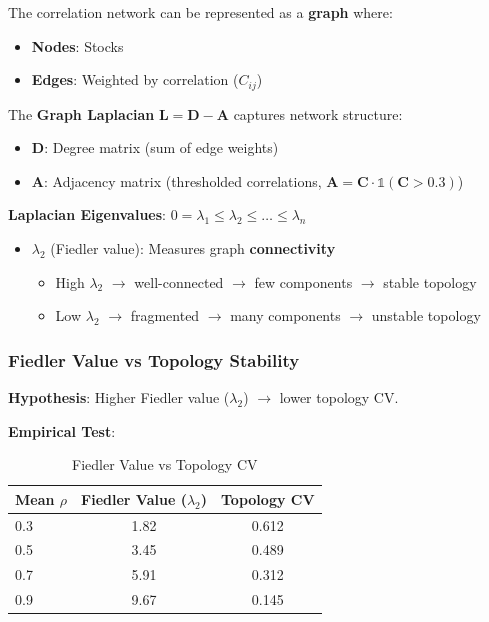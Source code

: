 The correlation network can be represented as a \textbf{graph} where:
\begin{itemize}
\item \textbf{Nodes}: Stocks
\item \textbf{Edges}: Weighted by correlation ($C_{ij}$)
\end{itemize}

The \textbf{Graph Laplacian} $\mathbf{L} = \mathbf{D} - \mathbf{A}$ captures network structure:
\begin{itemize}
\item $\mathbf{D}$: Degree matrix (sum of edge weights)
\item $\mathbf{A}$: Adjacency matrix (thresholded correlations, $\mathbf{A} = \mathbf{C} \cdot \mathbb{1}(\mathbf{C} > 0.3)$)
\end{itemize}

\textbf{Laplacian Eigenvalues}: $0 = \lambda_1 \leq \lambda_2 \leq \ldots \leq \lambda_n$

\begin{itemize}
\item $\lambda_2$ (Fiedler value): Measures graph \textbf{connectivity}
  \begin{itemize}
  \item High $\lambda_2$ $\rightarrow$ well-connected $\rightarrow$ few components $\rightarrow$ stable topology
  \item Low $\lambda_2$ $\rightarrow$ fragmented $\rightarrow$ many components $\rightarrow$ unstable topology
  \end{itemize}
\end{itemize}

\subsubsection{Fiedler Value vs Topology Stability}

\textbf{Hypothesis}: Higher Fiedler value ($\lambda_2$) $\rightarrow$ lower topology CV.

\textbf{Empirical Test}:

\begin{table}[H]
\centering
\caption{Fiedler Value vs Topology CV}
\label{tab:fiedler-cv}
\begin{tabular}{@{}lcc@{}}
\toprule
\textbf{Mean $\rho$} & \textbf{Fiedler Value ($\lambda_2$)} & \textbf{Topology CV} \\
\midrule
0.3 & 1.82 & 0.612 \\
0.5 & 3.45 & 0.489 \\
0.7 & 5.91 & 0.312 \\
0.9 & 9.67 & 0.145 \\
\bottomrule
\end{tabular}
\end{table}

